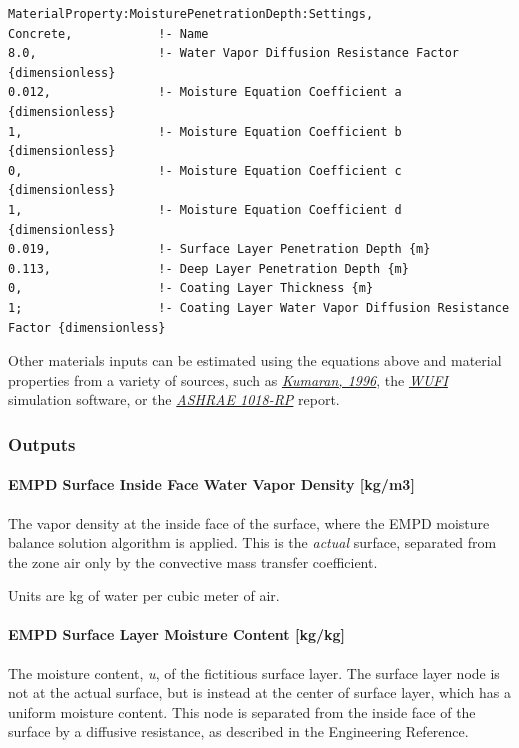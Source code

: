 \begin{lstlisting}
MaterialProperty:MoisturePenetrationDepth:Settings,
Concrete,            !- Name
8.0,                 !- Water Vapor Diffusion Resistance Factor {dimensionless}
0.012,               !- Moisture Equation Coefficient a {dimensionless}
1,                   !- Moisture Equation Coefficient b {dimensionless}
0,                   !- Moisture Equation Coefficient c {dimensionless}
1,                   !- Moisture Equation Coefficient d {dimensionless}
0.019,               !- Surface Layer Penetration Depth {m}
0.113,               !- Deep Layer Penetration Depth {m}
0,                   !- Coating Layer Thickness {m}
1;                   !- Coating Layer Water Vapor Diffusion Resistance Factor {dimensionless}
\end{lstlisting}

Other materials inputs can be estimated using the equations above and
material properties from a variety of sources, such as
\href{http://www.iea-ebc.org/fileadmin/user_upload/images/Pictures/EBC_Annex_24_Report_3.pdf}{\emph{Kumaran,
		1996}}, the \href{http://WUFI.de/en/}{\emph{WUFI}} simulation software,
or the \href{http://www.techstreet.com/products/1719052}{\emph{ASHRAE
		1018-RP}} report.

\subsubsection{Outputs}\label{moisture-penetration-depth-empd-outputs}

\paragraph{EMPD Surface Inside Face Water Vapor Density
	{[}kg/m3{]}}\label{empd-surface-inside-face-water-vapor-density-kgm3}

The vapor density at the inside face of the surface, where the EMPD
moisture balance solution algorithm is applied. This is the
\emph{actual} surface, separated from the zone air only by the
convective mass transfer coefficient.

Units are kg of water per cubic meter of air.

\paragraph{EMPD Surface Layer Moisture Content
	{[}kg/kg{]}}\label{empd-surface-layer-moisture-content-kgkg}

The moisture content, \emph{u}, of the fictitious surface layer. The
surface layer node is not at the actual surface, but is instead at the
center of surface layer, which has a uniform moisture content. This node
is separated from the inside face of the surface by a diffusive
resistance, as described in the Engineering Reference.

